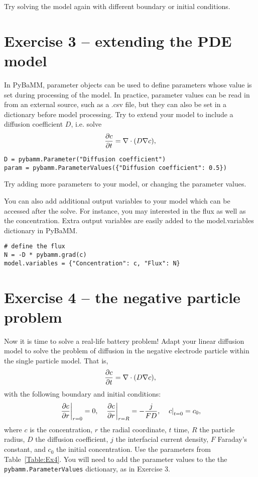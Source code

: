 \documentclass[a4paper,11pt]{article}
\begin{document}
Try solving the model again with different boundary or initial conditions.

\pagebreak
\section*{Exercise 3 -- extending the PDE model}
In PyBaMM, parameter objects can be used to define parameters whose value is set during processing of the model. In practice, parameter values can be read in from an external source, such as a .csv file, but they can also be set in a dictionary before model processing. Try to extend your model to include a diffusion coefficient $D$, i.e. solve
\begin{equation*}
  \pdv{c}{t} = \nabla \cdot (D \nabla c),
\end{equation*}

\begin{lstlisting}[label={Ex3_parameter},caption=Adding a parameter and setting its value]
D = pybamm.Parameter("Diffusion coefficient")
param = pybamm.ParameterValues({"Diffusion coefficient": 0.5})
\end{lstlisting}

Try adding more parameters to your model, or changing the parameter values.

You can also add additional output variables to your model which can be accessed after the solve. For instance, you may interested in the flux as well as the concentration. Extra output variables are easily added to the model.variables dictionary in PyBaMM.

\begin{lstlisting}[label={Ex3_extra_vars},caption=Adding extra output variables]
# define the flux
N = -D * pybamm.grad(c)
model.variables = {"Concentration": c, "Flux": N}
\end{lstlisting}

\pagebreak
\section*{Exercise 4 -- the negative particle problem}
Now it is time to solve a real-life battery problem! Adapt your linear diffusion model to solve the problem of diffusion in the negative electrode particle within the single particle model. That is,
\begin{equation*}
  \pdv{c}{t} = \nabla \cdot (D \nabla c),
\end{equation*}
with the following boundary and initial conditions:
\begin{equation*}
  \left.\pdv{c}{r}\right\vert_{r=0} = 0, \quad \left.\pdv{c}{r}\right\vert_{r=R} = -\frac{j}{FD}, \quad \left.c\right\vert_{t=0} = c_0,
\end{equation*}
where $c$ is the concentration, $r$ the radial coordinate, $t$ time, $R$ the particle radius, $D$ the diffusion coefficient, $j$ the interfacial current density, $F$ Faraday's constant, and $c_0$ the initial concentration. Use the parameters from Table~\ref{Table:Ex4}. You will need to add the parameter values to the the \texttt{pybamm.ParameterValues} dictionary, as in Exercise 3.
\end{document}
